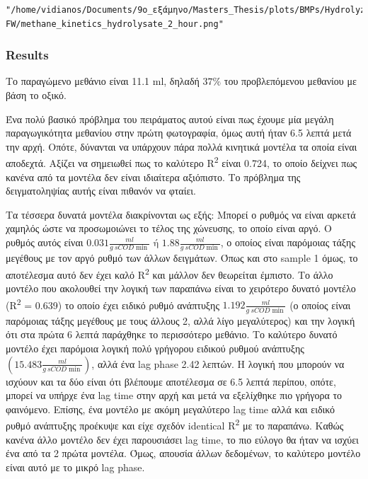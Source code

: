 \documentclass[11pt]{article}
\begin{document}
\begin{verbatim}
"/home/vidianos/Documents/9o_εξάμηνο/Masters_Thesis/plots/BMPs/Hydrolyzed FW/methane_kinetics_hydrolysate_2_hour.png"
\end{verbatim}

\subsubsection{Results}
\label{sec:org39a0e3d}
Το παραγώμενο μεθάνιο είναι 11.1 ml, δηλαδή \(37 \%\) του προβλεπόμενου μεθανίου με βάση το οξικό.

Ένα πολύ βασικό πρόβλημα του πειράματος αυτού είναι πως έχουμε μία μεγάλη παραγωγικότητα μεθανίου στην πρώτη φωτογραφία, όμως αυτή ήταν 6.5 λεπτά μετά την αρχή. Οπότε, δύνανται να υπάρχουν πάρα πολλά κινητικά μοντέλα τα οποία είναι αποδεχτά. Αξίζει να σημειωθεί πως το καλύτερο R\textsuperscript{2} είναι 0.724, το οποίο δείχνει πως κανένα από τα μοντέλα δεν είναι ιδιαίτερα αξιόπιστο. Το πρόβλημα της δειγματοληψίας αυτής είναι πιθανόν να φταίει.

Τα τέσσερα δυνατά μοντέλα διακρίνονται ως εξής: Μπορεί ο ρυθμός να είναι αρκετά χαμηλός ώστε να προσωμοιώνει το τέλος της χώνευσης, το οποίο είναι αργό. Ο ρυθμός αυτός είναι \(0.031 \frac{ml}{g ~ sCOD \min } \text{ ή } 1.88 \frac{ml}{g ~ sCOD \min }\), ο οποίος είναι παρόμοιας τάξης μεγέθους με τον αργό ρυθμό των άλλων δειγμάτων. Όπως και στο sample 1 όμως, το αποτέλεσμα αυτό δεν έχει καλό R\textsuperscript{2} και μάλλον δεν θεωρείται έμπιστο. Το άλλο μοντέλο που ακολουθεί την λογική των παραπάνω είναι το χειρότερο δυνατό μοντέλο (R\textsuperscript{2} = 0.639) το οποίο έχει ειδικό ρυθμό ανάπτυξης \(1.192 \frac{ml}{g ~ sCOD \min }\) (ο οποίος είναι παρόμοιας τάξης μεγέθους με τους άλλους 2, αλλά λίγο μεγαλύτερος) και την λογική ότι στα πρώτα 6 λεπτά παράχθηκε το περισσότερο μεθάνιο. Το καλύτερο δυνατό μοντέλο έχει παρόμοια λογική πολύ γρήγορου ειδικού ρυθμού ανάπτυξης \(\left( 15.483 \frac{ml}{g ~ sCOD \min } \right)\), αλλά ένα lag phase 2.42 λεπτών. Η λογική που μπορούν να ισχύουν και τα δύο είναι ότι βλέπουμε αποτέλεσμα σε 6.5 λεπτά περίπου, οπότε, μπορεί να υπήρχε ένα lag time στην αρχή και μετά να εξελίχθηκε πιο γρήγορα το φαινόμενο. Επίσης, ένα μοντέλο με ακόμη μεγαλύτερο lag time αλλά και ειδικό ρυθμό ανάπτυξης προέκυψε και είχε σχεδόν identical R\textsuperscript{2} με το παραπάνω. Καθώς κανένα άλλο μοντέλο δεν έχει παρουσιάσει lag time, το πιο εύλογο θα ήταν να ισχύει ένα από τα 2 πρώτα μοντέλα. Όμως, απουσία άλλων δεδομένων, το καλύτερο μοντέλο είναι αυτό με το μικρό lag phase.
\end{document}
